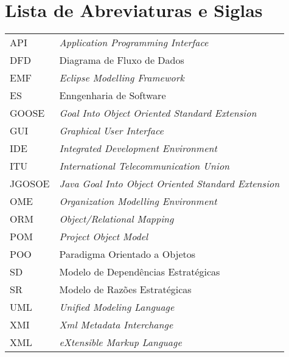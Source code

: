 
\pagebreak
{}
\listoffigures


\pagebreak
{}
\chapter*{Lista de Abreviaturas e Siglas}
\begin{tabular}{ll}
	API			& \textit{Application Programming Interface}\\
	DFD			& Diagrama de Fluxo de Dados\\
    EMF         & \textit{Eclipse Modelling Framework}\\
    ES          & Enngenharia de Software\\
    GOOSE       & \textit{Goal Into Object Oriented Standard Extension }\\
    GUI         & \textit{Graphical User Interface}\\
	IDE			& \textit{Integrated Development Environment}\\
	ITU			& \textit{International Telecommunication Union}\\
	JGOSOE		& \textit{Java Goal Into Object Oriented Standard Extension }\\
    OME         & \textit{Organization Modelling Environment }\\
    ORM         & \textit{Object/Relational Mapping}\\
    POM         & \textit{Project Object Model}\\
	POO			& Paradigma Orientado a Objetos\\
    SD          & Modelo de Dependências Estratégicas\\
    SR          & Modelo de Razões Estratégicas\\
	UML			& \textit{Unified Modeling Language}\\
	XMI			& \textit{Xml Metadata Interchange}\\
	XML			& \textit{eXtensible Markup Language}\\
\end{tabular}

